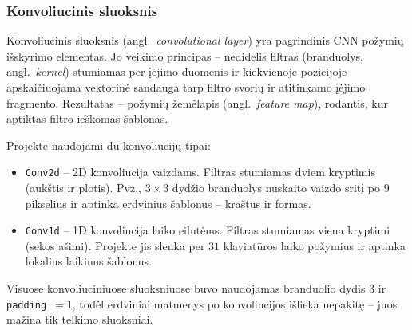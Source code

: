\subsubsection{Konvoliucinis sluoksnis}
\label{subsubsec:konvoliucinis_sluoksnis}

Konvoliucinis sluoksnis (angl.~\textit{convolutional layer}) yra pagrindinis CNN požymių išskyrimo elementas. Jo veikimo principas – nedidelis filtras (branduolys, angl.~\textit{kernel}) stumiamas per įėjimo duomenis ir kiekvienoje pozicijoje apskaičiuojama vektorinė sandauga tarp filtro svorių ir atitinkamo įėjimo fragmento. Rezultatas – požymių žemėlapis (angl.~\textit{feature map}), rodantis, kur aptiktas filtro ieškomas šablonas.

Projekte naudojami du konvoliucijų tipai:
\begin{itemize}
    \item \texttt{Conv2d} – 2D konvoliucija vaizdams. Filtras stumiamas dviem kryptimis (aukštis ir plotis). Pvz., $3 \times 3$ dydžio branduolys nuskaito vaizdo sritį po $9$ pikselius ir aptinka erdvinius šablonus – kraštus ir formas.
    \item \texttt{Conv1d} – 1D konvoliucija laiko eilutėms. Filtras stumiamas viena kryptimi (sekos ašimi). Projekte jis slenka per $31$ klaviatūros laiko požymius ir aptinka lokalius laikinus šablonus.
\end{itemize}

Visuose konvoliuciniuose sluoksniuose buvo naudojamas branduolio dydis $3$ ir \texttt{padding}~$= 1$, todėl erdviniai matmenys po konvoliucijos išlieka nepakitę – juos mažina tik telkimo sluoksniai.
